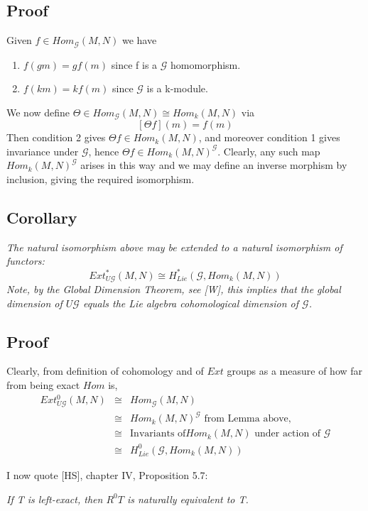 \subsection*{Proof}
Given $f\in Hom_\mathcal G (M,N)$ we have \begin{enumerate}
    \item $f(gm)=gf(m)$ since f is a $\mathcal G$ homomorphism.
    \item $f(km) = k f(m)$ since $\mathcal G$ is a k-module.
\end{enumerate}
We now define $\Theta \in Hom_\mathcal G (M,N) \cong {Hom_k(M,N)}$
via
$$[\Theta f ](m)= f(m)$$
Then condition 2 gives $\Theta f \in Hom_k(M,N)$, and moreover
condition 1 gives invariance under $\mathcal G$, hence $\Theta f
\in {Hom_k(M,N)}^\mathcal G$. Clearly, any such map
${Hom_k(M,N)}^\mathcal G$ arises in this way and we may define an
inverse morphism by inclusion, giving the required isomorphism.

\subsection{Corollary}\label{df4.4.2}
\emph{The natural isomorphism above may be extended to a natural
isomorphism of functors:
$$ Ext_{U\mathcal G}^* (M,N) \cong H^*_{Lie}(\mathcal G,
Hom_k(M,N))$$ Note, by the Global Dimension Theorem, see [W], this
implies that the global dimension of $U\mathcal G$ equals the Lie
algebra cohomological dimension of $\mathcal G$.}

\subsection*{Proof}
Clearly, from definition of cohomology and of $Ext$ groups as a
measure of how far from being exact $Hom$ is,
\begin{eqnarray}
\nonumber Ext_{U\mathcal G}^0 (M,N) &\cong& Hom_\mathcal G (M,N)\\
\nonumber                           &\cong& Hom_k(M,N)^\mathcal G \text{ from Lemma above,}\\
\nonumber                           &\cong& \text{Invariants of
$Hom_k(M,N)$ under action of $\mathcal G$}\\
\nonumber                           &\cong& H^0_{Lie}(\mathcal G,
Hom_k(M,N))\end{eqnarray}

I now quote [HS], chapter IV, Proposition 5.7:

\emph{If T is left-exact, then $R^0T$ is naturally equivalent to
T.}

